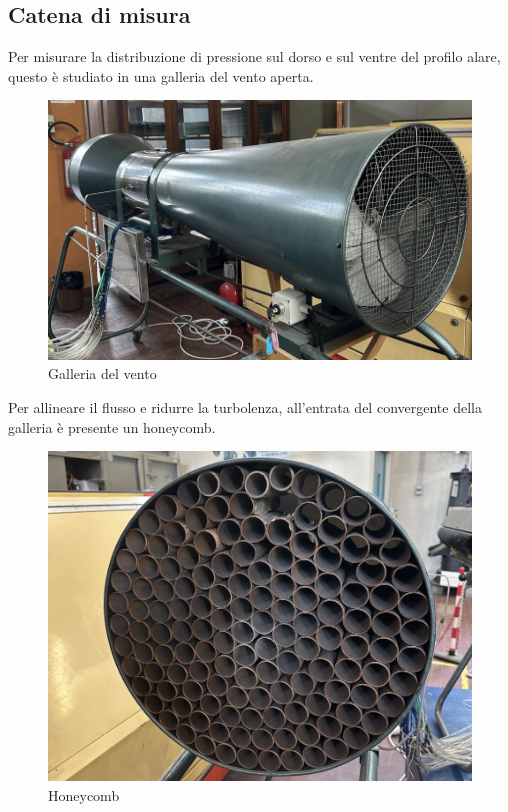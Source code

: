 \subsection{Catena di misura}
Per misurare la distribuzione di pressione sul dorso e sul ventre del profilo alare, questo è studiato in una galleria del vento aperta.
\begin{figure}[H]
    \centering
    \includegraphics[width=.7\textwidth]{images/5/galleria.jpg}
    \caption{Galleria del vento}
\end{figure}

\noindent Per allineare il flusso e ridurre la turbolenza, all'entrata del convergente della galleria è presente un honeycomb.
\begin{figure}[H]
    \centering
    \includegraphics[width=.6\textwidth]{images/5/honeycomb.jpg}
    \caption{Honeycomb}
\end{figure}

